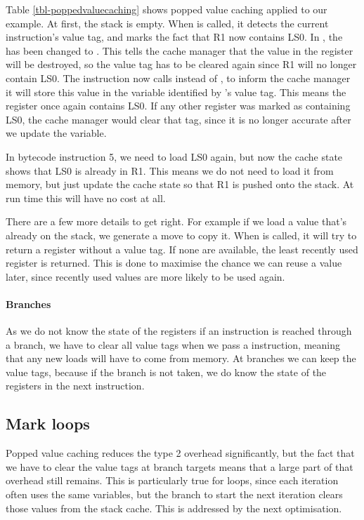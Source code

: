 Table \ref{tbl-poppedvaluecaching} shows popped value caching applied to our example. At first, the stack is empty. When  is called, it detects the current instruction's value tag, and marks the fact that R1 now contains LS0. In , the  has been changed to . This tells the cache manager that the value in the register will be destroyed, so the value tag has to be cleared again since R1 will no longer contain LS0. The  instruction now calls  instead of  , to inform the cache manager it will store this value in the variable identified by 's value tag. This means the register once again contains LS0. If any other register was marked as containing LS0, the cache manager would clear that tag, since it is no longer accurate after we update the variable.

In bytecode instruction 5, we need to load LS0 again, but now the cache state shows that LS0 is already in R1. This means we do not need to load it from memory, but just update the cache state so that R1 is pushed onto the stack. At run time this  will have no cost at all.

There are a few more details to get right. For example if we load a value that's already on the stack, we generate a move to copy it. When  is called, it will try to return a register without a value tag. If none are available, the least recently used register is returned. This is done to maximise the chance we can reuse a value later, since recently used values are more likely to be used again.

\paragraph{Branches} As we do not know the state of the registers if an instruction is reached through a branch, we have to clear all value tags when we pass a  instruction, meaning that any new loads will have to come from memory. At branches we can keep the value tags, because if the branch is not taken, we do know the state of the registers in the next instruction.

\subsection{Mark loops}
\label{sec-optimisation-markloops}

Popped value caching reduces the type 2 overhead significantly, but the fact that we have to clear the value tags at branch targets means that a large part of that overhead still remains. This is particularly true for loops, since each iteration often uses the same variables, but the branch to start the next iteration clears those values from the stack cache. This is addressed by the next optimisation.

